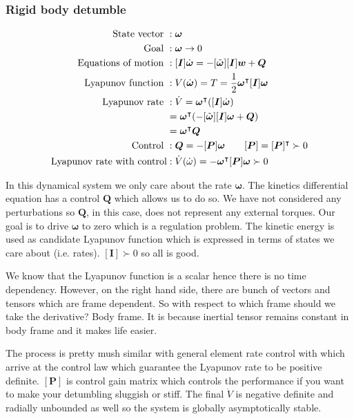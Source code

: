 \documentclass{article}
\begin{document}
\subsubsection{Rigid body detumble}
\begin{equation*}
  \begin{split}
    \textnormal{State vector }&:\bm{\omega}\\
    \textnormal{Goal }&:\bm{\omega}\rightarrow0\\
    \textnormal{Equations of motion }&:[\bm{I}]\dot{\bm{\omega}}=-[\tilde{\bm{\omega}}][\bm{I}]\bm{w}+\bm{Q}\\
    \textnormal{Lyapunov function }&:V(\dot{\bm{\omega}})=T=\frac{1}{2}\bm{\omega}^{\intercal}[\bm{I}]\bm{\omega}\\
    \textnormal{Lyapunov rate }&:\dot{V}=\bm{\omega}^{\intercal}([\bm{I}]\dot{\bm{\omega}})\\
    &=\bm{\omega}^{\intercal}(-[\tilde{\bm{\omega}}][\bm{I}]\bm{\omega}+\bm{Q})\\
    &=\bm{\omega}^{\intercal}\bm{Q}\\
    \textnormal{Control }&: \bm{Q}=-[\bm{P}]\bm{\omega}\quad\quad[\bm{P}]=[\bm{P}]^{\intercal}\succ0\\
    \textnormal{Lyapunov rate with control}&:\dot{V}(\dot{\omega})=-\bm{\omega}^{\intercal}[\bm{P}]\bm{\omega}\succ0\\
  \end{split}
\end{equation*}

In this dynamical system we only care about the rate $\bm{\omega}$. The kinetics differential equation has a control $\bm{Q}$ which allows us to do so. We have not considered any perturbations so $\bm{Q}$, in this case, does not represent any external torques. Our goal is to drive $\bm{\omega}$ to zero which is a regulation problem. The kinetic energy is used as candidate Lyapunov function which is expressed in terms of states we care about (i.e. rates). $[\bm{I}]\succ0$ so all is good. 

We know that the Lyapunov function is a scalar hence there is no time dependency. However, on the right hand side, there are bunch of vectors and tensors which are frame dependent. So with respect to which frame should we take the derivative? Body frame. It is because inertial tensor remains constant in body frame and it makes life easier.

The process is pretty mush similar with general element rate control with which arrive at the control law which guarantee the Lyapunov rate to be positive definite. $[\bm{P}]$ is control gain matrix which controls the performance if you want to make your detumbling sluggish or stiff. The final $\dot{V}$ is negative definite and radially unbounded as well so the system is globally asymptotically stable. 
\end{document}
